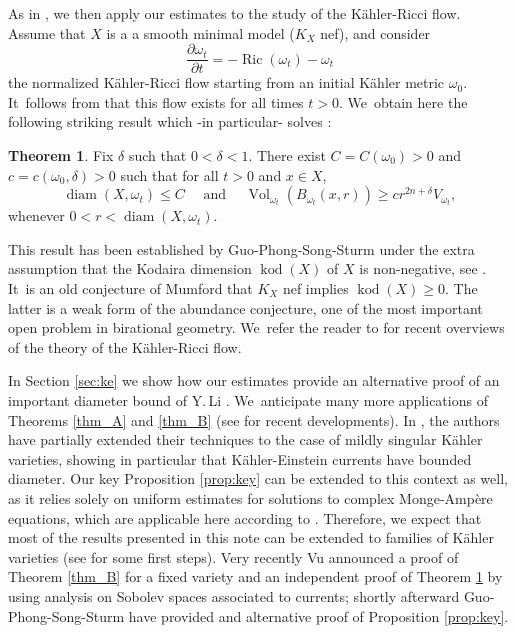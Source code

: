 \documentclass[JEP,XML,SOM,Unicode,published]{cedram}
\DeclareMathOperator{\diam}{diam}
\DeclareMathOperator{\kod}{kod}
\DeclareMathOperator{\Ric}{Ric}
\DeclareMathOperator{\Vol}{Vol}
\theoremstyle{definition}
\newtheorem{thmA}{Theorem}
\begin{document}
As in \cite{GPSS22}, we then apply our estimates to the study of the Kähler-Ricci flow.
Assume that $X$ is a a smooth minimal model ($K_X$ nef), and consider\vspace*{-3pt}
\[
\frac{\partial \omega_t}{\partial t}=-\Ric(\omega_t)-\omega_t
\]
the normalized Kähler-Ricci flow starting from an initial Kähler metric $\omega_0$. It~follows from \cite{TZ06} that this flow exists for all times $t>0$. We~obtain here the following striking result which -in particular- solves \cite[Conj.\,6.2]{Tos18}:

\begin{thmA}\label{thm_C}
Fix $\delta$ such that $0<\delta<1$.
There exist $C=C(\omega_0)>0$ and $c=c(\omega_0,\delta)>0$ such that for all $t>0$ and $x \in X$,\vspace*{-3pt}
\[
\diam(X,\omega_t) \leq C
\quad \text{ and } \quad
\Vol_{\omega_t}(B_{\omega_t}(x,r)) \geq c r^{2n+\delta} V_{\omega_t},
\]
whenever $0<r<\diam(X,\omega_t)$.
\end{thmA}

This result has been established by Guo-Phong-Song-Sturm under the extra assumption that
the Kodaira dimension $\kod(X)$ of $X$ is non-negative, see \cite[Th.\,2.3]{GPSS22}. It~is an old conjecture of Mumford that $K_X$ nef implies $\kod(X) \geq 0$.
The latter is a weak form of the abundance conjecture, one of the most important open problem in
birational geometry. We~refer the reader to \cite{Tos18,Tos24} for recent overviews of the theory of the Kähler-Ricci flow.

In Section \ref{sec:ke} we show how our estimates provide an alternative proof of an important
diameter bound of Y.\,Li \cite[Th.\,1.4]{Li23}. We~anticipate many more applications of Theorems \ref{thm_A} and \ref{thm_B} (see \cite{CGNPPW23,GP24} for recent developments).
In \cite{GPSS23}, the authors have partially extended their techniques
to the case of mildly singular Kähler varieties, showing in particular that Kähler-Einstein currents have
bounded diameter. Our key Proposition \ref{prop:key} can be extended to this context as well, as it relies solely
on uniform estimates for solutions to complex Monge-Ampère equations,
which are applicable here according to \cite[Th.\,1.9]{DnGG23}.
Therefore, we expect that most of the results presented in this note can be extended to families of
Kähler varieties (see \cite[\S 3]{GP24} for some first steps).
Very recently Vu \cite{V24} announced a proof of Theorem \ref{thm_B} for a fixed variety
and an independent proof of Theorem \ref{thm_C} by using analysis on Sobolev spaces associated to currents;
shortly afterward Guo-Phong-Song-Sturm \cite{GPSS24} have provided and alternative proof of Proposition \ref{prop:key}.
\end{document}
